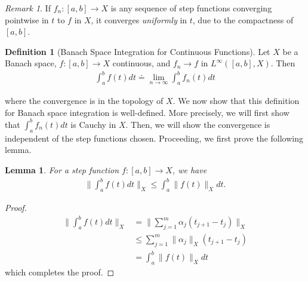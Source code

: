 \documentclass[12pt,reqno]{amsart}
\numberwithin{equation}{section}  %
\numberwithin{figure}{section}
\theoremstyle{plain}
\newtheorem{lemma}{Lemma}
\theoremstyle{definition}
\newtheorem{definition}{Definition}
\theoremstyle{remark}
\newtheorem{remark}{Remark}
\begin{document}
%
\begin{framed}
\begin{remark}
  \label{rem:unif}
If $f_{n}: [a,b] \to X$ is any sequence of step functions converging pointwise
in $t$ to $f$ in $X$, it converges \emph{uniformly} in $t$, due to the
compactness of $[a,b]$. 
\end{remark}
\end{framed}
%
\begin{definition}[Banach Space Integration for Continuous Functions]
  \label{def:banach}
  Let $X$ be a Banach space, $f: [a,b] \to X$ continuous, and $f_{n} \to f$ in
  $L^{\infty}([a,b], X)$. Then 
  \begin{equation*}
  \begin{split}
    \int_{a}^{b} f(t) dt \doteq \lim_{n \to \infty} \int_{a}^{b} f_{n}(t) dt
  \end{split}
  \end{equation*}
\end{definition}
%
where the convergence is in the topology of $X$. We now show that this
definition for Banach space integration is
well-defined. More precisely, we will first show that $\int_{a}^{b}
f_{n}(t) dt$ is Cauchy in $X$. Then, we will show the convergence is independent
of the step functions chosen. Proceeding, we first prove the following lemma.
%
%
%
%
%
%
%
%
%
%
\begin{lemma}
  For a step function $f: [a,b] \to X$, we have
  \begin{equation*}
  \begin{split}
    \| \int_{a}^{b} f(t) dt \|_{X} \le \int_{a}^{b} \| f(t) \|_{X} dt.
  \end{split}
  \end{equation*}
\label{lem:tri-ineq-int}
\end{lemma}
%
%
%
%
\begin{proof}
%
%
\begin{equation*}
\begin{split}
  \| \int_{a}^{b} f(t) dt \|_{X} &
  = \| \sum_{j=1}^{m}\alpha_{j} (t_{j+1} - t_{j})
  \|_{X}
  \\
  & \le  \sum_{j=1}^{m} \| \alpha_{j} \|_{X} (t_{j+1} - t_{j})
  \\
  & = \int_{a}^{b} \| f(t) \|_{X} dt
\end{split}
\end{equation*}
%
which completes the proof.
%
\end{proof}
\end{document}
